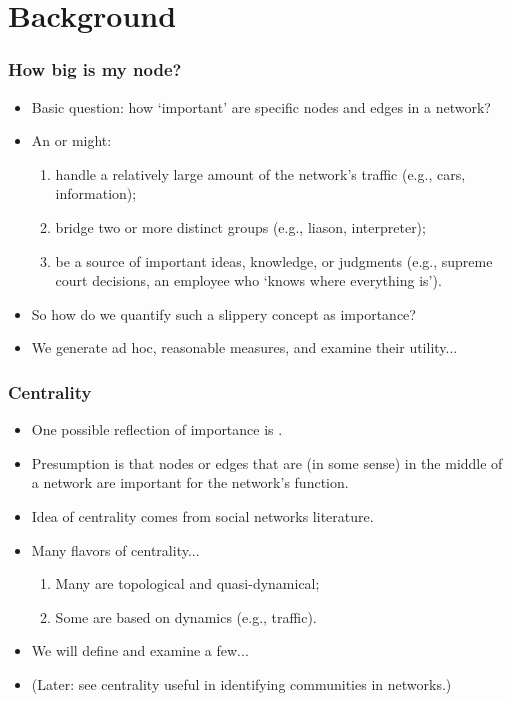 \section{Background}



\begin{frame}
  \frametitle{How big is my node?}

  \begin{itemize}
  \item<1-> 
    \alert{Basic question:} 
    how `important' are specific nodes and edges in a network?
  \item<2-> 
    An  or  might:
    \begin{enumerate}
    \item<3-> 
      \alert{handle} a relatively large amount of the network's traffic
      (e.g., cars, information);
    \item<4-> 
      \alert{bridge} two or more distinct groups (e.g., liason, interpreter);
    \item<5->
      be a \alert{source} of important ideas, knowledge, or judgments
      (e.g., supreme court decisions, an employee who `knows where everything is').
    \end{enumerate}
  \item<6-> 
    So how do we quantify such a slippery concept as importance?
  \item<7-> 
    We generate ad hoc, reasonable
    measures, and examine their utility...
  \end{itemize}

\end{frame}

\begin{frame}
  \frametitle{Centrality}

  \begin{itemize}
  \item<1->
    One possible reflection of importance is
    .
  \item<2->
    Presumption is that nodes or edges 
    that are (in some sense) in the middle of
    a network are important for the network's function.
  \item<3->
    Idea of centrality comes
    from social networks literature\cite{wasserman1994a}.
  \item<4->
    Many flavors of centrality...
    \begin{enumerate}
    \item 
      Many are topological and quasi-dynamical;
    \item 
      Some are based on dynamics (e.g., traffic).
    \end{enumerate}
  \item<5->
    We will define and examine a few...
  \item<6->
    (Later: see centrality useful in identifying communities
    in networks.)
  \end{itemize}

\end{frame}

